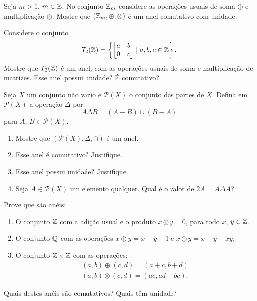 \documentclass[12pt]{exam}
\begin{document}
    \vspace{.4cm}

    \questao{} Seja $m > 1$, $m \in \mathbb{Z}$. No conjunto $\mathbb{Z}_m$ considere as opera\c{c}\~oes usuais de soma $\oplus$ e multiplica\c{c}\~ao $\otimes$. Mostre que $(\mathbb{Z}_m, \oplus, \otimes)$ \'e um anel comutativo com unidade.

    \vspace{.4cm}

    \questao{} Considere o conjunto
    \[
     T_2(\mathbb{Z}) = \left\{\begin{bmatrix}a & b\\ 0 & c\end{bmatrix} \mid a, b, c \in \mathbb{Z}\right\}.
    \]
    Mostre que $T_2(\mathbb{Z})$ é um anel, com as operações usuais de soma e multiplicação de matrizes. Esse anel possui unidade? É comutativo?

    \questao{} Seja $X$ um conjunto não vazio e $\mathcal{P}(X)$ o conjunto das partes de $X$. Defina em $\mathcal{P}(X)$ a operação $\Delta$ por
    \[
        A \Delta B = (A - B) \cup (B - A)
    \]
    para $A$, $B \in \mathcal{P}(X)$.
    \begin{enumerate}[label={\alph*})]
        \item Mostre que $(\mathcal{P}(X), \Delta, \cap)$ é um anel.

        \item Esse anel é comutativo? Justifique.

        \item Esse anel possui unidade? Justifique.

        \item Seja $A \in \mathcal{P}(X)$ um elemento qualquer. Qual é o valor de $2A = A \Delta A$?
    \end{enumerate}

    \vspace{.3cm}

    \questao{} Prove que s\~ao an\'eis:
    \begin{enumerate}[label={\alph*})]
        \item O conjunto $\mathbb{Z}$ com a adi\c{c}\~ao usual e o produto $x \otimes y = 0$, para todo $x$, $y \in \mathbb{Z}$.
        \item O conjunto $\mathbb{Q}$ com as opera\c{c}\~oes $x \oplus y = x + y - 1$ e $x \odot y = x + y - xy$.
        \item O conjunto $\mathbb{Z} \times \mathbb{Z}$ com as opera\c{c}\~oes:
        \begin{align*}
            (a, b) \oplus (c, d) = (a + c, b + d)\\
            (a ,b) \otimes (c, d) = (ac, ad + bc).
        \end{align*}
    \end{enumerate}
    Quais destes an\'eis s\~ao comutativos? Quais t\^em unidade?
\end{document}
